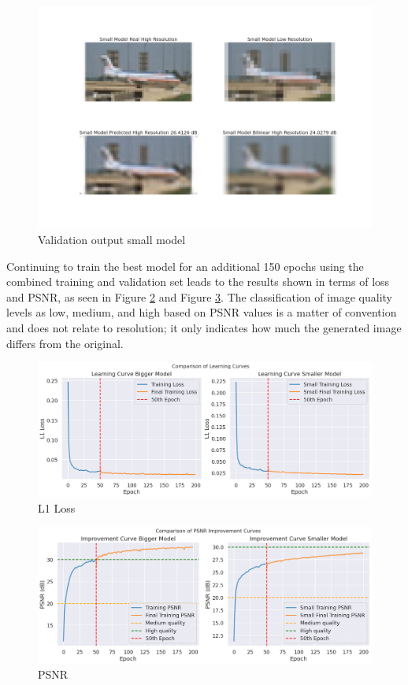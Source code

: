 \documentclass[../report.tex]{subfiles}
\begin{document}
\begin{figure}[H]
	\caption{Validation output small model}
	\centering
	\label{fig:validation_small}
	\includegraphics[width=\textwidth]{../images/validation_prediction_comparison_small_model.jpg}
\end{figure}
Continuing to train the best model for an additional 150 epochs using the combined training and validation set leads to the results shown in terms of loss and PSNR, as seen in Figure \ref{fig:loss} and Figure \ref{fig:db}. The classification of image quality levels as low, medium, and high based on PSNR values is a matter of convention and does not relate to resolution; it only indicates how much the generated image differs from the original.
\begin{figure}[H]
	\caption{L1 Loss}
	\centering
	\label{fig:loss}
	\includegraphics[width=\textwidth]{../images/learning_comparison.png}
\end{figure}

\begin{figure}[H]
	\caption{PSNR}
	\centering
	\label{fig:db}
	\includegraphics[width=\textwidth]{../images/psnr_comparison.png}
\end{figure}
\end{document}
